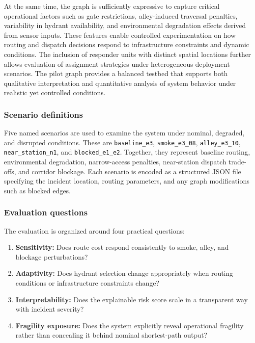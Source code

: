 At the same time, the graph is sufficiently expressive to capture critical operational factors such as gate restrictions, alley-induced traversal penalties, variability in hydrant availability, and environmental degradation effects derived from sensor inputs. These features enable controlled experimentation on how routing and dispatch decisions respond to infrastructure constraints and dynamic conditions. The inclusion of responder units with distinct spatial locations further allows evaluation of assignment strategies under heterogeneous deployment scenarios. The pilot graph provides a balanced testbed that supports both qualitative interpretation and quantitative analysis of system behavior under realistic yet controlled conditions.


\subsubsection{Scenario definitions}
Five named scenarios are used to examine the system under nominal, degraded, and disrupted conditions. These are \texttt{baseline\_e3}, \texttt{smoke\_e3\_08}, \texttt{alley\_e3\_10}, \texttt{near\_station\_n1}, and \texttt{blocked\_e1\_e2}. Together, they represent baseline routing, environmental degradation, narrow-access penalties, near-station dispatch trade-offs, and corridor blockage. Each scenario is encoded as a structured JSON file specifying the incident location, routing parameters, and any graph modifications such as blocked edges.

\subsubsection{Evaluation questions}
The evaluation is organized around four practical questions:
\begin{enumerate}
    \item \textbf{Sensitivity:} Does route cost respond consistently to smoke, alley, and blockage perturbations?
    \item \textbf{Adaptivity:} Does hydrant selection change appropriately when routing conditions or infrastructure constraints change?
    \item \textbf{Interpretability:} Does the explainable risk score scale in a transparent way with incident severity?
    \item \textbf{Fragility exposure:} Does the system explicitly reveal operational fragility rather than concealing it behind nominal shortest-path output?
\end{enumerate}

